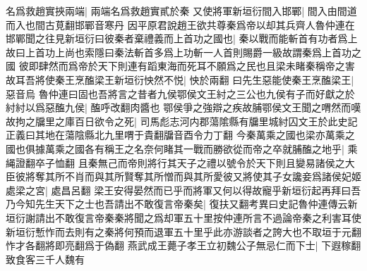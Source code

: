 名爲救趙實挾兩端|{
	兩端名爲救趙實貳於秦}
又使將軍新垣衍間入邯鄲|{
	間入由間道而入也間古莧翻邯鄲音寒丹}
因平原君說趙王欲共尊秦爲帝以却其兵齊人魯仲連在邯鄲聞之往見新垣衍曰彼秦者棄禮義而上首功之國也|{
	秦以戰而能斬首有功者爲上故曰上首功上尚也索隱曰秦法斬首多爲上功斬一人首則賜爵一級故謂秦爲上首功之國}
彼即肆然而爲帝於天下則連有蹈東海而死耳不願爲之民也且梁未睹秦稱帝之害故耳吾將使秦王烹醢梁王新垣衍怏然不悦|{
	怏於兩翻}
曰先生惡能使秦王烹醢梁王|{
	惡音烏}
魯仲連曰固也吾將言之昔者九侯鄂侯文王紂之三公也九侯有子而好獻之於紂紂以爲惡醢九侯|{
	醢呼改翻肉醬也}
鄂侯爭之強辯之疾故脯鄂侯文王聞之喟然而嘆故拘之牖里之庫百日欲令之死|{
	司馬彪志河内郡蕩隂縣有牖里城紂囚文王於此史記正義曰其地在蕩陰縣北九里喟于貴翻牖音酉令力丁翻}
今秦萬乘之國也梁亦萬乘之國也俱據萬乘之國各有稱王之名奈何睹其一戰而勝欲從而帝之卒就脯醢之地乎|{
	乘䋲證翻卒子恤翻}
且秦無己而帝則將行其天子之禮以號令於天下則且變易諸侯之大臣彼將奪其所不肖而與其所賢奪其所憎而與其所愛彼又將使其子女讒妾爲諸侯妃姬處梁之宮|{
	處昌呂翻}
梁王安得晏然而已乎而將軍又何以得故寵乎新垣衍起再拜曰吾乃今知先生天下之士也吾請出不敢復言帝秦矣|{
	復扶又翻考異曰史記魯仲連傳云新垣衍謝請出不敢復言帝秦秦將聞之爲却軍五十里按仲連所言不過論帝秦之利害耳使新垣衍慙怍而去則有之秦將何預而退軍五十里乎此亦游談者之誇大也不取垣于元翻怍才各翻將即亮翻爲于偽翻}
燕武成王薨子孝王立初魏公子無忌仁而下士|{
	下遐稼翻}
致食客三千人魏有

